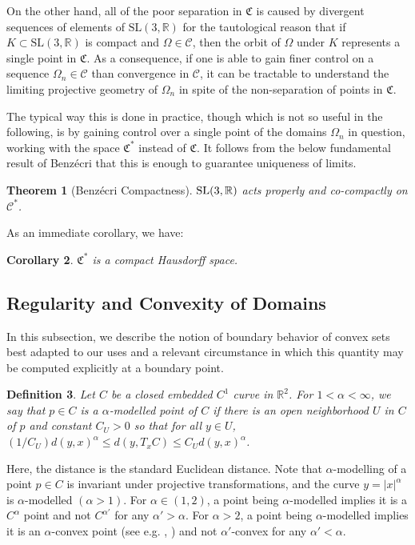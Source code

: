 \documentclass[12pt,a4paper]{amsart}
\theoremstyle{definition}
\theoremstyle{plain}
\newtheorem{theorem}{Theorem}[section]
\newtheorem{corollary}[theorem]{Corollary}
\newtheorem{definition}[theorem]{Definition}
\numberwithin{equation}{section}
\begin{document}
On the other hand, all of the poor separation in $\mathfrak{C}$ is caused by divergent sequences of elements of $\text{SL}(3, \mathbb{R})$ for the tautological reason that if $K \subset \text{SL}(3, \mathbb{R})$ is compact and $\Omega \in \mathcal{C}$, then the orbit of $\Omega$ under $K$ represents a single point in $\mathfrak{C}$. As a consequence, if one is able to gain finer control on a sequence $\Omega_n \in \mathcal{C}$ than convergence in $\mathcal{C}$, it can be tractable to understand the limiting projective geometry of $\Omega_n$ in spite of the non-separation of points in $\mathfrak{C}$.

The typical way this is done in practice, though which is not so useful in the following, is by gaining control over a single point of the domains $\Omega_n$ in question, working with the space $\mathfrak{C}^*$ instead of $\mathfrak{C}$. It follows from the below fundamental result of Benz\'ecri that this is enough to guarantee uniqueness of limits.

\begin{theorem}[Benz\'ecri Compactness]
 $\text{{\rm {SL}}}(3, \mathbb{R})$ acts properly and co-compactly on $\mathcal{C}^*$.
\end{theorem}

As an immediate corollary, we have:

\begin{corollary} $\mathfrak{C}^*$ is a compact Hausdorff space.
\end{corollary}

\subsection{Regularity and Convexity of Domains}\label{benoist-lemma-statement}

In this subsection, we describe the notion of boundary behavior of convex sets best adapted to our uses and a relevant circumstance in which this quantity may be computed explicitly at a boundary point.

\begin{definition} Let $C$ be a closed embedded $C^1$ curve in $\mathbb{R}^2$. For $1 < \alpha < \infty$, we say that $p \in C$ is a {\rm{$\alpha$-modelled point}} of $C$ if there is an open neighborhood $U$ in $C$ of $p$ and constant $C_U > 0$ so that for all $y \in U$, $(1/C_U) d(y,x)^\alpha \leq d(y, T_xC) \leq C_U d(y,x)^\alpha$.
\end{definition}

Here, the distance is the standard Euclidean distance. Note that $\alpha$-modelling of a point $p \in C$ is invariant under projective transformations, and the curve $y = |x|^\alpha$ is $\alpha$-modelled $(\alpha > 1)$. For $\alpha \in (1,2)$, a point being $\alpha$-modelled implies it is a $C^\alpha$ point and not $C^{\alpha'}$ for any $\alpha' > \alpha$. For $\alpha > 2$, a point being $\alpha$-modelled implies it is an $\alpha$-convex point (see e.g. \cite{benoist2004convexesI}, \cite{guichard2005regularity}) and not $\alpha'$-convex for any $\alpha' < \alpha$.
\end{document}

